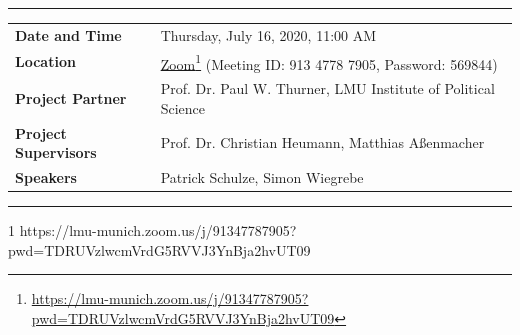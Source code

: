 \documentclass[12pt,reqno]{article}
\begin{document}
\begin{titlepage}
\vspace{-0.2cm}
\noindent
\rule{\textwidth}{1.5pt}
\begin{table}[htb!]
\setlength{\tabcolsep}{1mm}
\begin{center}
\begin{tabular}{l l}
\textbf{Date and Time} & Thursday, July 16, 2020, 11:00 AM  \\
\textbf{Location} & \href{https://lmu-munich.zoom.us/j/91347787905?pwd=TDRUVzlwcmVrdG5RVVJ3YnBja2hvUT09}{Zoom}\footnote{\url{https://lmu-munich.zoom.us/j/91347787905?pwd=TDRUVzlwcmVrdG5RVVJ3YnBja2hvUT09}} (Meeting ID: 913 4778 7905, Password: 569844) \\
\textbf{Project Partner} & Prof. Dr. Paul W. Thurner, LMU Institute of Political Science \\
\textbf{Project Supervisors} & Prof. Dr. Christian Heumann, Matthias Aßenmacher \\

\textbf{Speakers} & Patrick Schulze, Simon Wiegrebe
 
 
\end{tabular}
\end{center}
\vspace{-0.2cm}
\rule{\textwidth}{1.5pt}
\footnotesize 1 https://lmu-munich.zoom.us/j/91347787905?pwd=TDRUVzlwcmVrdG5RVVJ3YnBja2hvUT09
\end{table}

\end{titlepage}
\end{document}
